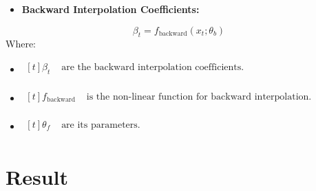 \documentclass{ieeeojies}
\begin{document}
\begin{itemize}
    \item  \textbf{Backward Interpolation Coefficients:} 
\end{itemize}
\begin{equation}
\beta_t = f_{\text{backward}}(x_t; \theta_b)
\end{equation}
Where: 
\begin{itemize}
    \item $\begin{aligned}[t]
            \beta_t & \text{ are the backward interpolation coefficients.} \\
            \end{aligned}$
    \item $\begin{aligned}[t]
            f_{\text{backward}} & \text{ is the non-linear function for backward interpolation.} \\
            \end{aligned}$
    \item $\begin{aligned}[t]
            \theta_f & \text{ are its parameters.} \\
            \end{aligned}$
\end{itemize}

\section{Result}
\end{document}
